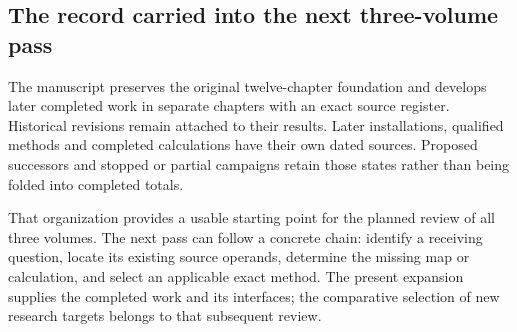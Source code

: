 \subsection{The record carried into the next three-volume pass}

The manuscript preserves the original twelve-chapter foundation and develops later completed work in separate chapters with an exact source register. Historical revisions remain attached to their results. Later installations, qualified methods and completed calculations have their own dated sources. Proposed successors and stopped or partial campaigns retain those states rather than being folded into completed totals.

That organization provides a usable starting point for the planned review of all three volumes. The next pass can follow a concrete chain: identify a receiving question, locate its existing source operands, determine the missing map or calculation, and select an applicable exact method. The present expansion supplies the completed work and its interfaces; the comparative selection of new research targets belongs to that subsequent review.
